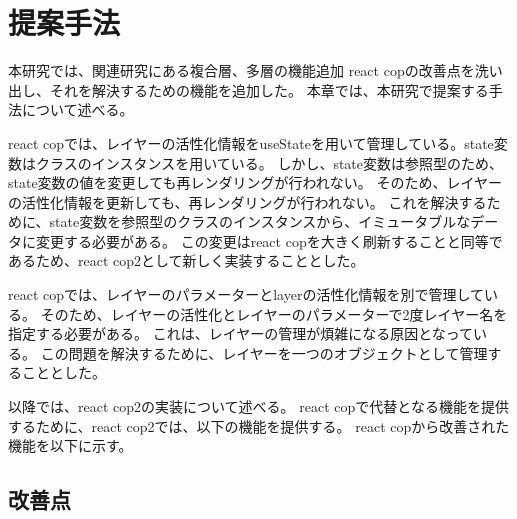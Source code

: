 \documentclass{jsarticle}
\begin{document}
    \fi
    \section{提案手法}
    本研究では、関連研究にある複合層、多層の機能追加
    react copの改善点を洗い出し、それを解決するための機能を追加した。
    本章では、本研究で提案する手法について述べる。

    react copでは、レイヤーの活性化情報をuseStateを用いて管理している。state変数はクラスのインスタンスを用いている。
    しかし、state変数は参照型のため、state変数の値を変更しても再レンダリングが行われない。
    そのため、レイヤーの活性化情報を更新しても、再レンダリングが行われない。
    これを解決するために、state変数を参照型のクラスのインスタンスから、イミュータブルなデータに変更する必要がある。
    この変更はreact copを大きく刷新することと同等であるため、react cop2として新しく実装することとした。

    react copでは、レイヤーのパラメーターとlayerの活性化情報を別で管理している。
    そのため、レイヤーの活性化とレイヤーのパラメーターで2度レイヤー名を指定する必要がある。
    これは、レイヤーの管理が煩雑になる原因となっている。
    この問題を解決するために、レイヤーを一つのオブジェクトとして管理することとした。

    以降では、react cop2の実装について述べる。
    react copで代替となる機能を提供するために、react cop2では、以下の機能を提供する。
    react copから改善された機能を以下に示す。








    \subsection{改善点}
\end{document}
